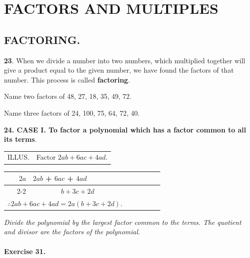 \documentclass{book}
\begin{document}
\chapter*{FACTORS AND MULTIPLES}

\section*{FACTORING.}

\textbf{23}. When we divide a number into two numbers,
which multiplied together will give a product equal to
the given number, we have found the factors of that
number. This process is called \textbf{factoring}.

Name two factors of 48, 27, 18, 35, 49, 72.

Name three factors of 24, 100, 75, 64, 72, 40.


\textbf{24. CASE I. To factor a polynomial which has
a factor common to all its terms}.

\begin{tabular}{ll}
ILLUS. & Factor $2 a b + 6 a c + 4 a d$.\\
\end{tabular}

\begin{center}
\begin{tabular}{rc rclcl}
 $2a$ & \multicolumn{1}{|l}{$2ab$ + $6ac$ + $4ad$}   \\
\cline{2-2}
     &    $b + 3c  + 2d $  \\
\multicolumn{2}{c}{$ \therefore 2 a b + 6 a c + 4 a d = 2 a
\left(b + 3 c + 2 d
\right) $.}\\
\end{tabular}
\end{center}

\textit{Divide the polynomial by the largest factor common
to the terms. The quotient and divisor are the
factors of the polynomial}.

\subsubsection*{Exercise 31.}
\end{document}
